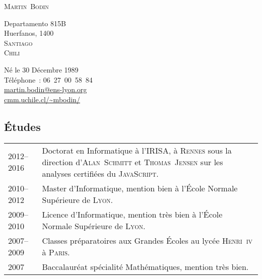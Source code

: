 \documentclass[12pt,a4paper]{article}
\makeatletter
\newenvironment{datecvsection}[1]%
               {\subsection*{#1}%
                 \noindent \begin{tabular}{@{}p{\annee}p{\texte}@{}}}
               {\end{tabular}}
\makeatother
\begin{document}
\pagestyle{empty}


\newlength{\annee}
\settowidth{\annee}{9999--9999}


\newlength{\texte}
\setlength{\texte}{\textwidth} \addtolength{\texte}{-\annee} 
	\addtolength{\texte}{-2\tabcolsep}

\begin{center} \Huge \textsc{Martin~Bodin} \end{center}

\parbox[c]{.5\textwidth}
{
  \noindent
  Departamento 815B \\
  Huerfanos, 1400 \\
  \textsc{Santiago} \\
  \textsc{Chili}
}
\parbox[c]{.55\textwidth}
{
\begin{flushright}
  Né le 30 Décembre 1989 \\
  \noindent Téléphone~: \mbox{06 27 00 58 84} \\
  \url{martin.bodin@ens-lyon.org} \\
  \url{cmm.uchile.cl/~mbodin/}
\end{flushright}
}


\begin{datecvsection}{Études}

	2012–2016 & Doctorat en Informatique à l’\textsc{IRISA}, à \textsc{Rennes} sous la direction d’\textsc{Alan~Schmitt} et \textsc{Thomas~Jensen} sur les analyses certifiées du \textsc{JavaScript}. \\

	2010–2012 & Master d’Informatique, mention bien à l’École Normale Supérieure de \textsc{Lyon}. \\

	2009–2010 & Licence d’Informatique, mention très bien à l’École Normale Supérieure de \textsc{Lyon}. \\

	2007–2009 & Classes préparatoires aux Grandes Écoles au lycée \textsc{Henri~iv} à \textsc{Paris}. \\

	2007 & Baccalauréat spécialité Mathématiques, mention très bien. \\

\end{datecvsection}
\end{document}
